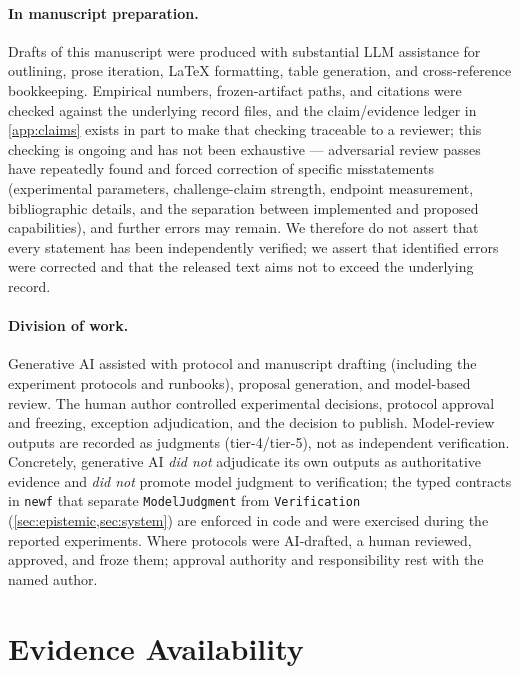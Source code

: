 \documentclass[11pt]{article}
\theoremstyle{gowthm}
\theoremstyle{gowplain}
\begin{document}
\paragraph{In manuscript preparation.} Drafts of this manuscript were
produced with substantial LLM assistance for outlining, prose iteration,
LaTeX formatting, table generation, and cross-reference bookkeeping.
Empirical numbers, frozen-artifact paths, and citations were checked against
the underlying record files, and the claim/evidence ledger in
\cref{app:claims} exists in part to make that checking traceable to a
reviewer; this checking is ongoing and has not been exhaustive --- adversarial
review passes have repeatedly found and forced correction of specific
misstatements (experimental parameters, challenge-claim strength, endpoint
measurement, bibliographic details, and the separation between implemented and
proposed capabilities), and further errors may remain. We therefore do not
assert that every statement has been independently verified; we assert that
identified errors were corrected and that the released text aims not to exceed
the underlying record.

\paragraph{Division of work.} Generative AI assisted with protocol and
manuscript drafting (including the experiment protocols and runbooks),
proposal generation, and model-based review. The human author controlled
experimental decisions, protocol approval and freezing, exception
adjudication, and the decision to publish. Model-review outputs are recorded
as judgments (tier-4/tier-5), not as independent verification. Concretely,
generative AI \emph{did not} adjudicate its own outputs as authoritative
evidence and \emph{did not} promote model judgment to verification; the typed
contracts in \texttt{newf} that separate \texttt{ModelJudgment} from
\texttt{Verification} (\cref{sec:epistemic,sec:system}) are enforced in code
and were exercised during the reported experiments. Where protocols were
AI-drafted, a human reviewed, approved, and froze them; approval authority and
responsibility rest with the named author.

\section*{Evidence Availability}
\end{document}
